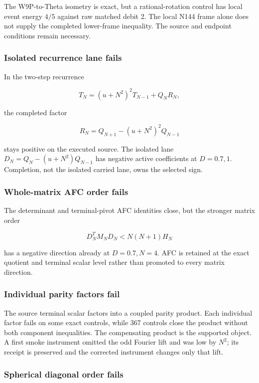 The W9P-to-Theta isometry is exact, but a rational-rotation control has
local event energy \(4/5\) against raw matched debit 2. The local N144
frame alone does not supply the completed lower-frame inequality. The
source and endpoint conditions remain necessary.

\subsubsection{Isolated recurrence lane
fails}\label{viii-ch06-isolated-recurrence-lane-fails}

In the two-step recurrence

\[
T_N=(u+N^2)^2T_{N-1}+Q_NR_N,
\]

the completed factor

\[
R_N=Q_{N+1}-(u+N^2)^2Q_{N-1}
\]

stays positive on the executed source. The isolated lane
\(D_N=Q_N-(u+N^2)Q_{N-1}\) has negative active coefficients at
\(D=0.7,1\). Completion, not the isolated carried lane, owns the
selected sign.

\subsubsection{Whole-matrix AFC order
fails}\label{viii-ch06-whole-matrix-afc-order-fails}

The determinant and terminal-pivot AFC identities close, but the
stronger matrix order

\[
D_N^TM_ND_N<N(N+1)H_N
\]

has a negative direction already at \(D=0.7,N=4\). AFC is retained at
the exact quotient and terminal scalar level rather than promoted to
every matrix direction.

\subsubsection{Individual parity factors
fail}\label{viii-ch06-individual-parity-factors-fail}

The source terminal scalar factors into a coupled parity product. Each
individual factor fails on some exact controls, while 367 controls close
the product without both component inequalities. The compensating
product is the supported object. A first smoke instrument omitted the
odd Fourier lift and was low by \(N^2\); its receipt is preserved and
the corrected instrument changes only that lift.

\subsubsection{Spherical diagonal order
fails}\label{viii-ch06-spherical-diagonal-order-fails}

